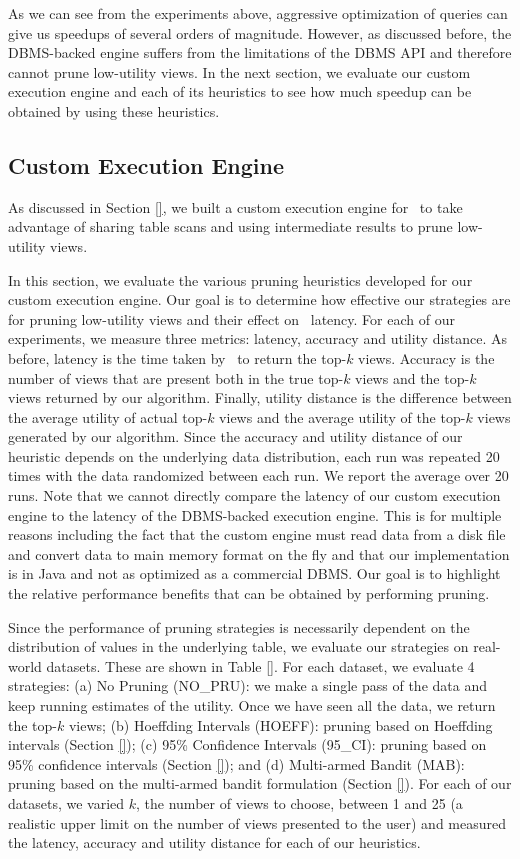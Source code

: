 As we can see from the experiments above, aggressive optimization of queries can
give us speedups of several orders of magnitude.
However, as discussed before, the DBMS-backed engine suffers from the
limitations of the DBMS API and therefore cannot prune low-utility views.
In the next section, we evaluate our custom execution engine and each of its
heuristics to see how much speedup can be obtained by using these heuristics.

\subsection{Custom Execution Engine}
\label{sec:custom_execution_engine}

As discussed in Section \ref{}, we built a custom execution engine for
\VizRecDB\ to take advantage of sharing table scans and using intermediate
results to prune low-utility views.

In this section, we evaluate the various pruning heuristics developed for our
custom execution engine.
Our goal is to determine how effective our strategies are for pruning
low-utility views and their effect on \VizRecDB\ latency.
For each of our experiments, we measure three metrics: latency, accuracy and
utility distance.
As before, latency is the time taken by \VizRecDB\ to return the top-$k$ views.
Accuracy is the number of views that are present
both in the true top-$k$ views and the top-$k$ views returned by our algorithm.
Finally, utility distance is the difference between the average utility of
actual top-$k$ views and the average utility of the top-$k$ views generated by our algorithm.
Since the accuracy and utility distance of our heuristic depends on the
underlying data distribution, each run was repeated 20 times with the data
randomized between each run. We report the average over 20 runs. 
Note that we cannot directly compare the latency
of our custom execution engine to the latency of the DBMS-backed execution engine.
This is for multiple reasons including the fact that the custom engine must read
data from a disk file and convert data to main memory format on the fly and that
our implementation is in Java and not as optimized as a commercial DBMS.
Our goal is to highlight the relative performance benefits that can be obtained
by performing pruning.

Since the performance of pruning strategies is necessarily dependent on the
distribution of values in the underlying table, we evaluate our strategies on
real-world datasets.
These are shown in Table \ref{}.
For each dataset, we evaluate 4 strategies: 
(a) No Pruning (NO\_PRU): we make a
single pass of the data and keep running estimates of the utility. Once we have
seen all the data, we return the top-$k$ views; 
(b) Hoeffding Intervals (HOEFF): pruning based on Hoeffding intervals (Section
\ref{});
(c) 95\% Confidence Intervals (95\_CI): pruning based on 95\% confidence
intervals (Section \ref{}); and 
(d) Multi-armed Bandit (MAB): pruning based on the multi-armed bandit
formulation (Section \ref{}).
For each of our datasets, we varied $k$, the number of views to choose, between
1 and 25 (a realistic upper limit on the number of views presented to the user)
and measured the latency, accuracy and utility distance for each of our
heuristics.

